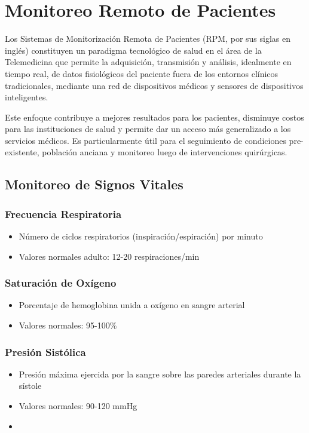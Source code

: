\section{Monitoreo Remoto de Pacientes}

Los Sistemas de Monitorización Remota de Pacientes (RPM, por sus siglas en inglés) constituyen un paradigma tecnológico de salud en el área de la Telemedicina 
que permite la adquisición, transmisión y análisis, idealmente en tiempo real, de datos fisiológicos del paciente fuera de los entornos clínicos tradicionales, 
mediante una red de dispositivos médicos y sensores de dispositivos inteligentes. \newline

Este enfoque contribuye a mejores resultados para los pacientes, disminuye costos para las instituciones de salud y permite dar un acceso más 
generalizado a los servicios médicos. Es particularmente útil para el seguimiento de condiciones pre-existente,
población anciana y monitoreo luego de intervenciones quirúrgicas.\parencite{rpm_iot}


\subsection{Monitoreo de Signos Vitales}

\subsubsection{Frecuencia Respiratoria}
\begin{itemize}
    \item Número de ciclos respiratorios (inspiración/espiración) por minuto
    \item Valores normales adulto: 12-20 respiraciones/min
\end{itemize}

\subsubsection{Saturación de Oxígeno}
\begin{itemize}
    \item Porcentaje de hemoglobina unida a oxígeno en sangre arterial
    \item Valores normales: {95-100\%}
\end{itemize}

\subsubsection{Presión Sistólica}
\begin{itemize}
    \item Presión máxima ejercida por la sangre sobre las paredes arteriales durante la sístole
    \item Valores normales: 90-120 mmHg
    \item 
\end{itemize}

